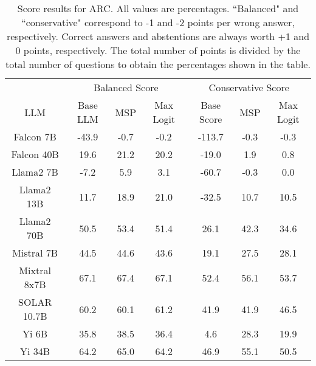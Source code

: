 \renewcommand\arraystretch{1.2}
\begin{table*}
\centering
\begin{tabular}{c|c|c|c|c|c|c}
& \multicolumn{3}{c|}{Balanced Score} & \multicolumn{3}{c}{Conservative Score} \\ 
LLM & Base LLM & MSP & Max Logit & Base Score & MSP & Max Logit\\ \hline
Falcon 7B & -43.9 & -0.7 & -0.2 & -113.7 & -0.3 & -0.3\\
Falcon 40B & 19.6 & 21.2 & 20.2 & -19.0 & 1.9 & 0.8\\
Llama2 7B & -7.2 & 5.9 & 3.1 & -60.7 & -0.3 & 0.0\\
Llama2 13B & 11.7 & 18.9 & 21.0 & -32.5 & 10.7 & 10.5\\
Llama2 70B & 50.5 & 53.4 & 51.4 & 26.1 & 42.3 & 34.6\\
Mistral 7B & 44.5 & 44.6 & 43.6 & 19.1 & 27.5 & 28.1\\
Mixtral 8x7B & 67.1 & 67.4 & 67.1 & 52.4 & 56.1 & 53.7\\
SOLAR 10.7B & 60.2 & 60.1 & 61.2 & 41.9 & 41.9 & 46.5\\
Yi 6B & 35.8 & 38.5 & 36.4 & 4.6 & 28.3 & 19.9\\
Yi 34B & 64.2 & 65.0 & 64.2 & 46.9 & 55.1 & 50.5\\
\hline
\end{tabular}
\caption{Score results for ARC. All values are percentages. ``Balanced" and ``conservative" correspond to -1 and -2 points per wrong answer, respectively. Correct answers and abstentions are always worth +1 and 0 points, respectively. The total number of points is divided by the total number of questions to obtain the percentages shown in the table.}
\label{tab:arc_score}
\end{table*}
